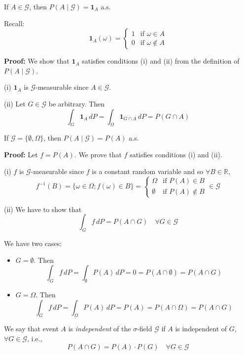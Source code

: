 \begin{example}
    

If \( A \in \mathcal{G} \), then \( P(A \mid \mathcal{G}) = \mathbf{1}_A \) a.s.

Recall:
\[
\mathbf{1}_A(\omega) =
\begin{cases} 
1 & \text{if } \omega \in A \\
0 & \text{if } \omega \notin A 
\end{cases}
\]

\textbf{Proof:} We show that \(\mathbf{1}_A\) satisfies conditions (i) and (ii) from the definition of \(P(A \mid \mathcal{G})\).

(i) \(\mathbf{1}_A\) is \(\mathcal{G}\)-measurable since \(A \in \mathcal{G}\).

(ii) Let \(G \in \mathcal{G}\) be arbitrary. Then
\[
\int_G \mathbf{1}_A \, dP = \int_\Omega \mathbf{1}_{G \cap A} \, dP = P(G \cap A)
\]
\end{example}
\begin{example}
If \(\mathcal{G} = \{\emptyset, \Omega\}\), then \(P(A \mid \mathcal{G}) = P(A)\) a.s.

\textbf{Proof:} Let \(f = P(A)\). We prove that \(f\) satisfies conditions (i) and (ii).

(i) \(f\) is \(\mathcal{G}\)-measurable since \(f\) is a constant random variable and so \(\forall B \in \mathbb{R}\),
\[
f^{-1}(B) = \{\omega \in \Omega; f(\omega) \in B\} = 
\begin{cases} 
\Omega & \text{if } P(A) \in B \\
\emptyset & \text{if } P(A) \notin B 
\end{cases} \in \mathcal{G}
\]

(ii) We have to show that
\[
\int_G f \, dP = P(A \cap G) \quad \forall G \in \mathcal{G} \tag{1}
\]

We have two cases:
\begin{itemize}
    \item \(G = \emptyset\). Then
    \[
    \int_G f \, dP = \int_\emptyset P(A) \, dP = 0 = P(A \cap \emptyset) = P(A \cap G)
    \]
    \item \(G = \Omega\). Then
    \[
    \int_G f \, dP = \int_\Omega P(A) \, dP = P(A) = P(A \cap \Omega) = P(A \cap G)
    \]
\end{itemize}
\end{example}

\begin{definition}
We say that event \(A\) is \textit{independent} of the \(\sigma\)-field \(\mathcal{G}\) if \(A\) is independent of \(G\), \(\forall G \in \mathcal{G}\), i.e.,
\[
P(A \cap G) = P(A) \cdot P(G) \quad \forall G \in \mathcal{G}
\]
\end{definition}



